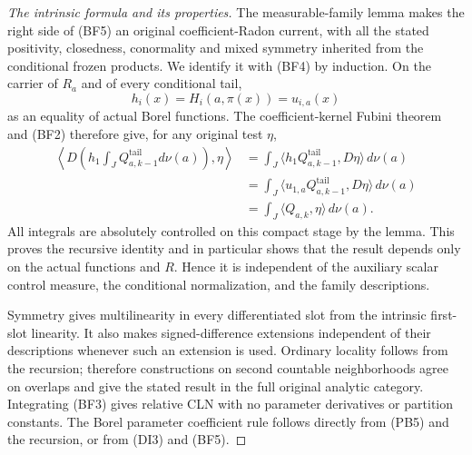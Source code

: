 \documentclass[11pt,a4paper]{article}
\numberwithin{equation}{section}
\theoremstyle{definition}
\theoremstyle{remark}
\begin{document}
\begin{proof}[The intrinsic formula and its properties]
The measurable-family lemma makes the right side of (BF5) an
original coefficient-Radon current, with all the stated positivity,
closedness, conormality and mixed symmetry inherited from the
conditional frozen products. We identify it with (BF4) by induction.
On the carrier of $R_a$ and of every conditional tail,
\[
                       h_i(x)=H_i(a,\pi(x))=u_{i,a}(x)
 \tag{BF7}
\]
as an equality of actual Borel functions. The coefficient-kernel
Fubini theorem and (BF2) therefore give, for any original test $\eta$,
\[
 \begin{split}
 \left\langle D\left(h_1\int_JQ^{\mathrm{tail}}_{a,k-1}d\nu(a)\right),
                                                           \eta\right\rangle
   &=\int_J\langle h_1Q^{\mathrm{tail}}_{a,k-1},D\eta\rangle\,d\nu(a)\\
   &=\int_J\langle u_{1,a}Q^{\mathrm{tail}}_{a,k-1},D\eta\rangle\,d\nu(a)\\
   &=\int_J\langle Q_{a,k},\eta\rangle\,d\nu(a).
 \end{split}
 \tag{BF8}
\]
All integrals are absolutely controlled on this compact stage by
the lemma. This proves the recursive identity and in particular
shows that the result depends only on the actual functions and $R$.
Hence it is independent of the auxiliary scalar control measure,
the conditional normalization, and the family descriptions.

Symmetry gives multilinearity in every differentiated slot from
the intrinsic first-slot linearity. It also makes signed-difference
extensions independent of their descriptions whenever such an
extension is used. Ordinary locality follows from the recursion;
therefore constructions on second countable neighborhoods agree
on overlaps and give the stated result in the full original
analytic category. Integrating (BF3) gives relative CLN with no
parameter derivatives or partition constants. The Borel parameter
coefficient rule follows directly from (PB5) and the recursion,
or from (DI3) and (BF5).
\end{proof}
\end{document}
